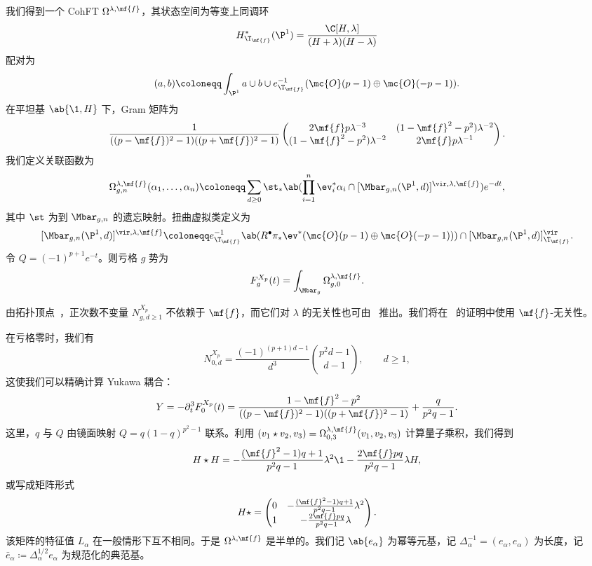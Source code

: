我们得到一个 CohFT \(\Omega^{\lambda,\mf{f}}\)，其状态空间为等变上同调环
\[ H^*_{\T_{\mf{f}}}(\P^1) = \frac{\C[H,\lambda]}{(H+\lambda)(H-\lambda)} \]
配对为
\[ (a,b) \coloneqq \int_{\P^1} a \cup b \cup e^{-1}_{\T_{\mf{f}}}(\mc{O}(p-1)\oplus\mc{O}(-p-1)). \]
在平坦基 \(\ab\{\1,H\}\) 下，Gram 矩阵为
\[ \frac{1}{((p-\mf{f})^2-1)((p+\mf{f})^2-1)}\begin{pmatrix} 2\mf{f}p\lambda^{-3} & (1-\mf{f}^2-p^2)\lambda^{-2} \\ (1-\mf{f}^2-p^2)\lambda^{-2} & 2\mf{f}p\lambda^{-1} \end{pmatrix}. \]
我们定义关联函数为
\[ \Omega^{\lambda,\mf{f}}_{g,n}(\alpha_1,\ldots,\alpha_n) \coloneqq \sum_{d\geq0}\st_*\ab(\prod_{i=1}^n \ev_i^*\alpha_i \cap [\Mbar_{g,n}(\P^1,d)]^{\vir,\lambda,\mf{f}})e^{-dt}, \]
其中 \(\st\) 为到 \(\Mbar_{g,n}\) 的遗忘映射。扭曲虚拟类定义为
\[ [\Mbar_{g,n}(\P^1,d)]^{\vir,\lambda,\mf{f}} \coloneqq e^{-1}_{\T_{\mf{f}}}\ab(R^{\bullet}\pi_*\ev^*(\mc{O}(p-1)\oplus\mc{O}(-p-1))) \cap [\Mbar_{g,n}(\P^1,d)]^{\vir}_{\T_{\mf{f}}}. \]
令 \(Q = (-1)^{p+1}e^{-t}\)。则亏格 \(g\) 势为
\[ F^{X_p}_g(t) = \int_{\Mbar_g} \Omega^{\lambda,\mf{f}}_{g,0}. \]

\begin{rmk}
    由拓扑顶点~\cite{LLLZ2009}，正次数不变量 \(N^{X_p}_{g,d\geq1}\) 不依赖于 \(\mf{f}\)，而它们对 \(\lambda\) 的无关性也可由~ 推出。我们将在~ 的证明中使用 \(\mf{f}\)-无关性。
\end{rmk}

在亏格零时，我们有
\[ N^{X_p}_{0,d} = \frac{(-1)^{(p+1)d-1}}{d^3}\binom{p^2d-1}{d-1}, \qquad d \geq 1, \]
这使我们可以精确计算 Yukawa 耦合：
\[ Y = -\partial_t^3 F_0^{X_p}(t) = \frac{1-\mf{f}^2-p^2}{((p-\mf{f})^2-1)((p+\mf{f})^2-1)} + \frac{q}{p^2q-1}. \]
这里，\(q\) 与 \(Q\) 由镜面映射 \(Q = q(1-q)^{p^2-1}\) 联系。利用 \((v_1 \star v_2, v_3) = \Omega^{\lambda,\mf{f}}_{0,3}(v_1,v_2,v_3)\) 计算量子乘积，我们得到
\[ H \star H = -\frac{(\mf{f}^2-1)q+1}{p^2q-1}\lambda^2 \1 - \frac{2\mf{f}pq}{p^2q-1}\lambda H, \]
或写成矩阵形式
\[ H \star = \begin{pmatrix} 0 & -\frac{(\mf{f}^2-1)q+1}{p^2q-1}\lambda^2 \\ 1 & -\frac{2\mf{f}pq}{p^2q-1}\lambda \end{pmatrix}. \]
该矩阵的特征值 \(L_{\alpha}\) 在一般情形下互不相同。于是 \(\Omega^{\lambda,\mf{f}}\) 是半单的。我们记 \(\ab\{e_{\alpha}\}\) 为幂等元基，记 \(\Delta_{\alpha}^{-1} = (e_{\alpha},e_{\alpha})\) 为长度，记 \(\bar{e}_{\alpha} \coloneqq \Delta_{\alpha}^{1/2}e_{\alpha}\) 为规范化的典范基。

